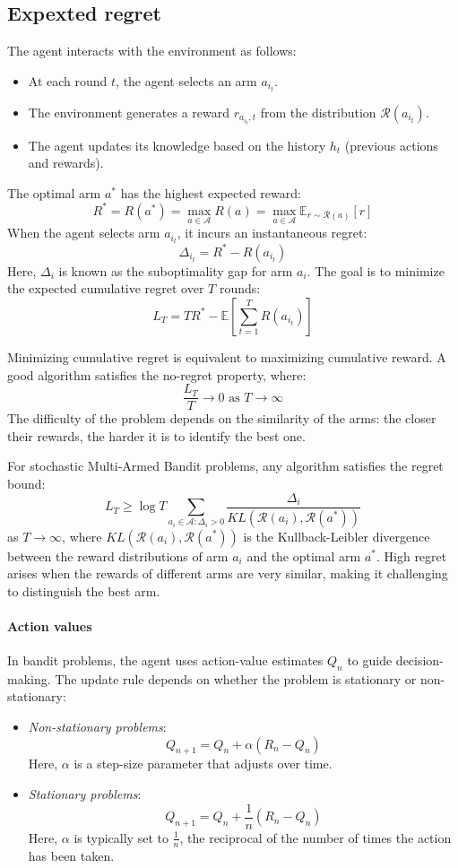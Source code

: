\subsection{Expexted regret}
The agent interacts with the environment as follows:
\begin{itemize}
    \item At each round $ t $, the agent selects an arm $ a_{i_t} $.
    \item The environment generates a reward $ r_{a_{i_t}, t} $ from the distribution $ \mathcal{R}(a_{i_t}) $.
    \item The agent updates its knowledge based on the history $ h_t $ (previous actions and rewards).
\end{itemize}
The optimal arm $ a^\ast $ has the highest expected reward:
\[R^\ast=R(a^\ast)=\max_{a\in\mathcal{A}}R(a)=\max_{a\in\mathcal{A}}\mathbb{E}_{r\sim \mathcal{R}(a)}[r]\]
When the agent selects arm $ a_{i_t} $, it incurs an instantaneous regret:
\[\Delta_{i_t}=R^\ast-R(a_{i_t})\]
Here, $ \Delta_i $ is known as the suboptimality gap for arm $ a_i $. 
The goal is to minimize the expected cumulative regret over $ T $ rounds:
\[L_T = T R^\ast - \mathbb{E}\left[\sum_{t=1}^T R(a_{i_t})\right]\]

Minimizing cumulative regret is equivalent to maximizing cumulative reward. 
A good algorithm satisfies the no-regret property, where:
\[\frac{L_T}{T} \to 0  \text{ as } T \to \infty\]
The difficulty of the problem depends on the similarity of the arms: the closer their rewards, the harder it is to identify the best one.
\begin{theorem}
    For stochastic Multi-Armed Bandit problems, any algorithm satisfies the regret bound:
    \[L_T \geq \log T \sum_{a_i \in \mathcal{A}: \Delta_i > 0} \frac{\Delta_i}{KL(\mathcal{R}(a_i), \mathcal{R}(a^\ast))}\]
    as $ T \to \infty $, where $ KL(\mathcal{R}(a_i), \mathcal{R}(a^\ast)) $ is the Kullback-Leibler divergence between the reward distributions of arm $ a_i $ and the optimal arm $ a^\ast $. High regret arises when the rewards of different arms are very similar, making it challenging to distinguish the best arm.
\end{theorem}

\paragraph*{Action values}
In bandit problems, the agent uses action-value estimates $ Q_n $ to guide decision-making. The update rule depends on whether the problem is stationary or non-stationary:
\begin{itemize}
    \item \textit{Non-stationary problems}:
    \[Q_{n+1} = Q_n + \alpha \left(R_n - Q_n\right)\]
    Here, $ \alpha $ is a step-size parameter that adjusts over time.
    \item \textit{Stationary problems}:
        \[Q_{n+1} = Q_n + \dfrac{1}{n} \left(R_n - Q_n\right)\]
        Here, $ \alpha $ is typically set to $ \frac{1}{n} $, the reciprocal of the number of times the action has been taken.
\end{itemize}


